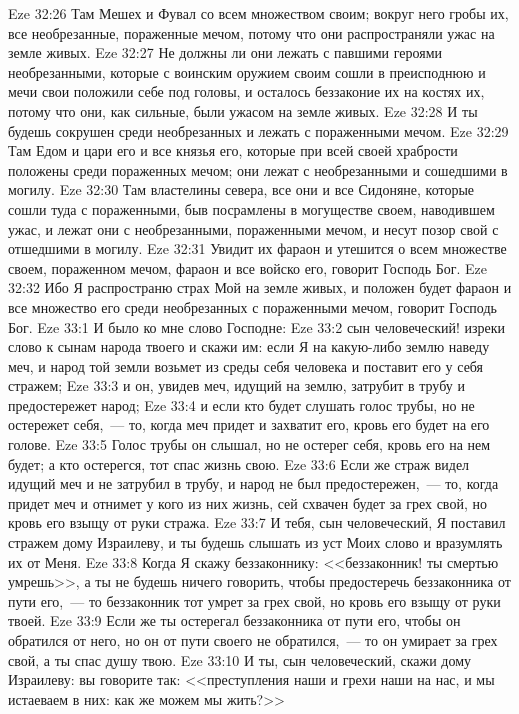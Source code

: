 \vs Eze 32:26 Там Мешех и Фувал со всем множеством своим; вокруг него гробы их, все необрезанные, пораженные мечом, потому что они распространяли ужас на земле живых.
\vs Eze 32:27 Не должны ли  они лежать с павшими героями необрезанными, которые с воинским оружием своим сошли в преисподнюю и мечи свои положили себе под головы, и осталось беззаконие их на костях их, потому что они, как сильные, были ужасом на земле живых.
\vs Eze 32:28 И ты будешь сокрушен среди необрезанных и лежать с пораженными мечом.
\vs Eze 32:29 Там Едом и цари его и все князья его, которые при всей своей храбрости положены среди пораженных мечом; они лежат с необрезанными и сошедшими в могилу.
\vs Eze 32:30 Там властелины севера, все они и все Сидоняне, которые сошли туда с пораженными, быв посрамлены в могуществе своем, наводившем ужас, и лежат они с необрезанными, пораженными мечом, и несут позор свой с отшедшими в могилу.
\vs Eze 32:31 Увидит их фараон и утешится о всем множестве своем, пораженном мечом, фараон и все войско его, говорит Господь Бог.
\vs Eze 32:32 Ибо Я распространю страх Мой на земле живых, и положен будет фараон и все множество его среди необрезанных с пораженными мечом, говорит Господь Бог.
\vs Eze 33:1 И было ко мне слово Господне:
\vs Eze 33:2 сын человеческий! изреки слово к сынам народа твоего и скажи им: если Я на какую-либо землю наведу меч, и народ той земли возьмет из среды себя человека и поставит его у себя стражем;
\vs Eze 33:3 и он, увидев меч, идущий на землю, затрубит в трубу и предостережет народ;
\vs Eze 33:4 и если кто будет слушать голос трубы, но не остережет себя,~--- то, когда меч придет и захватит его, кровь его будет на его голове.
\vs Eze 33:5 Голос трубы он слышал, но не остерег себя, кровь его на нем будет; а кто остерегся, тот спас жизнь свою.
\vs Eze 33:6 Если же страж видел идущий меч и не затрубил в трубу, и народ не был предостережен,~--- то, когда придет меч и отнимет у кого из них жизнь, сей схвачен будет за грех свой, но кровь его взыщу от руки стража.
\vs Eze 33:7 И тебя, сын человеческий, Я поставил стражем дому Израилеву, и ты будешь слышать из уст Моих слово и вразумлять их от Меня.
\vs Eze 33:8 Когда Я скажу беззаконнику: <<беззаконник! ты смертью умрешь>>, а ты не будешь ничего говорить, чтобы предостеречь беззаконника от пути его,~--- то беззаконник тот умрет за грех свой, но кровь его взыщу от руки твоей.
\vs Eze 33:9 Если же ты остерегал беззаконника от пути его, чтобы он обратился от него, но он от пути своего не обратился,~--- то он умирает за грех свой, а ты спас душу твою.
\vs Eze 33:10 И ты, сын человеческий, скажи дому Израилеву: вы говорите так: <<преступления наши и грехи наши на нас, и мы истаеваем в них: как же можем мы жить?>>
